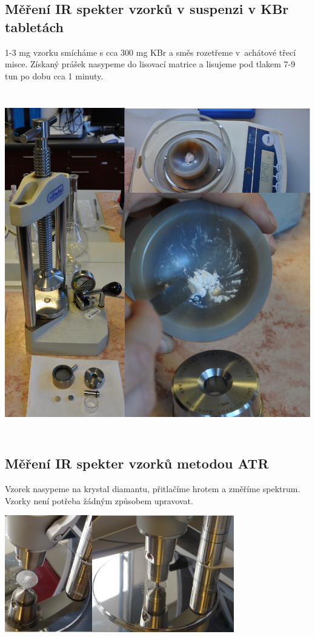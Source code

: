 \documentclass[12pt]{article}
\begin{document}
\subsection{Měření IR spekter vzorků v suspenzi v KBr tabletách}
	1-3 mg vzorku smícháme s cca 300 mg KBr a směs rozetřeme v~achátové třecí misce. Získaný prášek nasypeme do lisovací matrice a lisujeme pod tlakem 7-9 tun po dobu cca 1 minuty.
\begin{center}
	\includegraphics[keepaspectratio,height=15cm]{img/KBr.png}
\end{center}
\newpage

\subsection{Měření IR spekter vzorků metodou ATR}
Vzorek nasypeme na krystal diamantu, přitlačíme hrotem a změříme spektrum. Vzorky není potřeba žádným způsobem upravovat.

\begin{center}
	\includegraphics[keepaspectratio,width=10cm]{img/atr.png}
\end{center}
\end{document}
